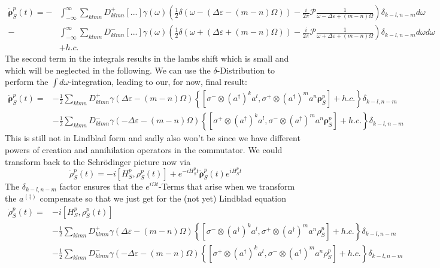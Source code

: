 	\begin{align*}
		\dot{\boldsymbol{\rho}}_S^p(t) = -& \int_{-\infty}^{\infty} \sum_{klmn}^{} D_{klmn}^+ \left[...\right] \gamma(\omega) \left(\frac{1}{2} \delta(\omega - (\Delta \varepsilon - (m-n) \Omega)) - \frac{i}{2\pi} \mathcal{P} \frac{1}{\omega - \Delta \varepsilon + (m-n) \Omega}\right) \delta_{k-l, n-m} d\omega  \\
		-& \int_{-\infty}^{\infty} \sum_{klmn}^{} D_{klmn}^- \left[...\right] \gamma(\omega) \left(\frac{1}{2} \delta(\omega + (\Delta \varepsilon + (m-n) \Omega)) - \frac{i}{2\pi} \mathcal{P} \frac{1}{\omega + \Delta \varepsilon + (m-n) \Omega}\right) \delta_{k-l, n-m} d\omega d\omega \\
		&+ h.c.
	\end{align*}
	The second term in the integrals results in the lambs shift which is small and which will be neglected in the following.
	We can use the $\delta$-Distribution to perform the $\int d\omega$-integration, leading to our, for now, final result:
	\begin{align*}
		\dot{\boldsymbol{\rho}}_S^p(t) = &- \frac{1}{2} \sum_{klmn}^{}  D_{klmn}^+ \gamma(\Delta \varepsilon - (m-n) \Omega) \left\{ \left[\sigma^- \otimes (a^\dagger)^k a^l, \sigma^+ \otimes (a^\dagger)^m a^n \boldsymbol{\rho}_S^p\right] + h.c. \right\} \delta_{k-l, n-m} \\
		&-\frac{1}{2} \sum_{klmn}^{}  D_{klmn}^- \gamma(- \Delta \varepsilon - (m-n) \Omega) \left\{ \left[\sigma^+ \otimes (a^\dagger)^k a^l, \sigma^- \otimes (a^\dagger)^m a^n \boldsymbol{\rho}_S^p\right] + h.c. \right\} \delta_{k-l, n-m}
	\end{align*}
	This is still not in Lindblad form and sadly also won't be since we have different powers of creation and annihilation operators in the commutator. We could transform back to the Schrödinger picture now via
	\begin{equation}
		\dot{{\rho}}_S^p(t) =	-i \left[H_S^p, {\rho}_S^p(t)\right] + e^{-i H_S^p t} \dot{\boldsymbol{\rho}}_S^p (t) e^{i H_S^p t}
	\end{equation}
	The $\delta_{k-l, n-m}$ factor ensures that the $e^{i\Omega t}$-Terms that arise when we transform the $a^{(\dagger)}$ compensate so that we just get for the (not yet) Lindblad equation
	\begin{align*}
		\dot{\rho}_S^p(t) = &-i \left[H_S^p,  {\rho}_S^p(t)\right] \\
		&- \frac{1}{2} \sum_{klmn}^{}  D_{klmn}^+ \gamma(\Delta \varepsilon - (m-n) \Omega) \left\{ \left[\sigma^- \otimes (a^\dagger)^k a^l, \sigma^+ \otimes (a^\dagger)^m a^n {\rho}_S^p\right] + h.c. \right\} \delta_{k-l, n-m} \\
		&-\frac{1}{2} \sum_{klmn}^{}  D_{klmn}^- \gamma(- \Delta \varepsilon - (m-n) \Omega) \left\{ \left[\sigma^+ \otimes (a^\dagger)^k a^l, \sigma^- \otimes (a^\dagger)^m a^n {\rho}_S^p\right] + h.c. \right\} \delta_{k-l, n-m}
	\end{align*}
